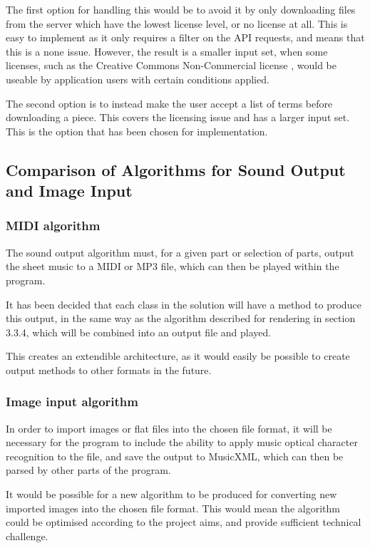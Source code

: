 The first option for handling this would be to avoid it by only downloading files from the server which have the lowest license level, or no license at all. This is easy to implement as it only requires a filter on the API requests, and means that this is a none issue. However, the result is a smaller input set, when some licenses, such as the Creative Commons Non-Commercial license \parencite{cc-nc}, would be useable by application users with certain conditions applied.

The second option is to instead make the user accept a list of terms before downloading a piece. This covers the licensing issue and has a larger input set. This is the option that has been chosen for implementation.

\subsection{Comparison of Algorithms for Sound Output and Image Input}
\subsubsection{MIDI algorithm}
The sound output algorithm must, for a given part or selection of parts, output the sheet music to a MIDI or MP3 file, which can then be played within the program. 

It has been decided that each class in the solution will have a method to produce this output, in the same way as the algorithm described for rendering in section 3.3.4, which will be combined into an output file and played.

This creates an extendible architecture, as it would easily be possible to create output methods to other formats in the future.

\subsubsection{Image input algorithm}
In order to import images or flat files into the chosen file format, it will be necessary for the program to include the ability to apply music optical character recognition to the file, and save the output to MusicXML, which can then be parsed by other parts of the program. 

It would be possible for a new algorithm to be produced for converting new imported images into the chosen file format. This would mean the algorithm  could be optimised according to the project aims, and provide sufficient technical challenge.

